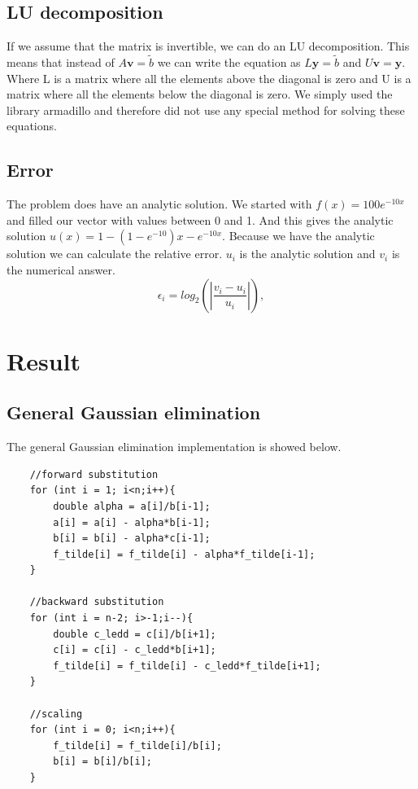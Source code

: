 \documentclass[12pt,norsk,a4paper]{article}
\begin{document}
\subsection{LU decomposition}
If we assume that the matrix is invertible, we can do an LU decomposition. This means that instead of $A \textbf{v} = \tilde{b}$ we can write the equation as $L\textbf{y} = \tilde{b}$ and $U\textbf{v} = \textbf{y}$. Where L is a matrix where all the elements above the diagonal is zero and U is a matrix where all the elements below the diagonal is zero. We simply used the library armadillo and therefore did not use any special method for solving these equations. 


\subsection{Error}

The problem does have an analytic solution. We started with $f(x) = 100e^{-10x}$ and filled our vector with values between 0 and 1. And this gives the analytic solution $u(x) = 1-(1-e^{-10})x-e^{-10x}$. Because we have the analytic solution we can calculate the relative error. $u_i$ is the analytic solution and $v_i$ is the numerical answer. 
\[
   \epsilon_i=log_{2}\left(\left|\frac{v_i-u_i}
                 {u_i}\right|\right),
\]
















\section{Result}


\subsection{General Gaussian elimination}
The general Gaussian elimination implementation is showed below. 

\begin{lstlisting}
    //forward substitution
    for (int i = 1; i<n;i++){
        double alpha = a[i]/b[i-1];
        a[i] = a[i] - alpha*b[i-1];
        b[i] = b[i] - alpha*c[i-1];
        f_tilde[i] = f_tilde[i] - alpha*f_tilde[i-1];
    }

    //backward substitution
    for (int i = n-2; i>-1;i--){
        double c_ledd = c[i]/b[i+1];
        c[i] = c[i] - c_ledd*b[i+1];
        f_tilde[i] = f_tilde[i] - c_ledd*f_tilde[i+1];
    }

    //scaling
    for (int i = 0; i<n;i++){
        f_tilde[i] = f_tilde[i]/b[i];
        b[i] = b[i]/b[i];
    }
\end{lstlisting}
\end{document}
